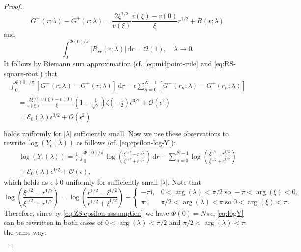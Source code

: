 \documentclass[12pt]{amsart}
\numberwithin{equation}{section}
\newcommand{\dd}{\mathrm{d}}
\newcommand{\ii}{\mathrm{i}}
\newcommand{\SP}{\lambda}
\newcommand{\phaseint}{\Phi}
\newcommand{\rr}{r}
\newcommand{\bigo}[1]{ \mathcal{O}\! \left( #1 \right) }
\begin{document}
\begin{proof}
\begin{equation}
G^-(\rr;\SP)-G^+(\rr;\SP)=\frac{2\xi^{1/2}}{v(\xi)}\frac{v(\xi)-v(0)}{\xi}\rr^{1/2} + R(\rr;\SP)
\label{eq:Gminus-plus}
\end{equation}
and 
\begin{equation}
\int_0^{\phaseint(0)/\pi}|R_{\rr\rr}(\rr;\SP)|\,\dd \rr = \bigo{1},\quad \SP\to 0.
\end{equation}
It follows by Riemann sum approximation (cf. \eqref{eq:midpoint-rule} and \eqref{eq:RS-square-root}) that
\begin{multline}
\int_0^{\phaseint(0)/\pi}[G^-(\rr;\SP)-G^+(\rr;\SP)]\,\dd \rr-\epsilon\sum_{n=0}^{N-1}[G^-(\rr_n;\SP)-G^+(\rr_n;\SP)] \\
\begin{aligned}
{}&= \frac{2\xi^{1/2}}{v(\xi)}\frac{v(\xi)-v(0)}{\xi}\left(1-\frac{1}{\sqrt{2}}\right)\zeta(-\tfrac{1}{2})\epsilon^{3/2}+\bigo{\epsilon^2}\\
{}&=\mathcal{E}_0(\SP)\epsilon^{3/2} + \bigo{\epsilon^2}\\
\end{aligned}
\label{eq:RS-approximation}
\end{multline}
holds uniformly for $|\SP|$ sufficiently small.
Now we use these observations to rewrite $\log(Y_\epsilon(\SP))$ as follows (cf. \eqref{eq:epsilon-log-Y}):
\begin{multline}
\log(Y_\epsilon(\SP))=\frac{1}{\epsilon}\int_0^{\phaseint(0)/\pi}\log\left(\frac{\xi^{1/2}-\rr^{1/2}}{\xi^{1/2}+\rr^{1/2}}\right)\,\dd \rr -\sum_{n=0}^{N-1}\log\left(\frac{\xi^{1/2}-\rr_n^{1/2}}{\xi^{1/2}+\rr_n^{1/2}}\right)\\
{} + \mathcal{E}_0(\SP)\epsilon^{1/2} + \bigo{\epsilon},
\label{eq:logY}
\end{multline}
which holds as $\epsilon\downarrow 0$ uniformly for sufficiently small $|\SP|$.
Note that 
\begin{equation}
\log\left(\frac{\xi^{1/2}-\rr^{1/2}}{\xi^{1/2}+\rr^{1/2}}\right)=
\log\left(\frac{\rr^{1/2}-\xi^{1/2}}{\rr^{1/2}+\xi^{1/2}}\right) +
\begin{cases}
-\pi \ii, & 0<\arg(\SP)<\pi/2 \;\text{so}\;-\pi<\arg(\xi)<0,\\
\pi \ii, & \pi/2<\arg(\SP)<\pi\;\text{so}\;0<\arg(\xi)<\pi.
\end{cases}
\end{equation}
Therefore, since by \eqref{eq:ZS-epsilon-assumption} we have $\phaseint(0)=N\pi\epsilon$, \eqref{eq:logY} can be rewritten in both cases of $0<\arg(\SP)<\pi/2$ and $\pi/2<\arg(\SP)<\pi$ the same way:
\begin{multline}

\end{multline}
\end{proof}
\end{document}
